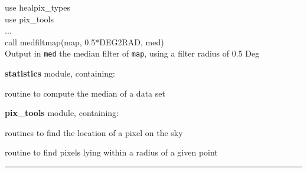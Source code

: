 \begin{example}
{
use healpix\_types \\
use pix\_tools \\
... \\
call medfiltmap(map, 0.5*DEG2RAD, med)  \\
}
{
Output in {\tt med} the median filter of {\tt map}, using a filter radius of 0.5 Deg
}
\end{example}

\begin{modules}
  \begin{sulist}{} %
  \item[\textbf{statistics}] module, containing:
  \item[\htmlref{median}{sub:median}] routine to compute the median of a data set		
  \item[\textbf{pix\_tools}] module, containing:
  \item[\htmlref{pix2vec\_ring, pix2vec\_nest}{sub:pix_tools}] routines to find
  the location of a pixel on the sky
  \item[\htmlref{query\_disc}{sub:query_disc}] routine to find pixels lying
  within a radius of a given point
  \end{sulist}
\end{modules}


\rule{\hsize}{2mm}

\newpage
